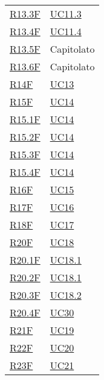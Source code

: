 \begin{center}
\begin{longtable}[!h]{p{50px} p{50px}}
        \hyperref[tab:RequisitiFunzionali]{R13.3F}   & \hyperref[sec:UC11.3]{UC11.3} \\
        \hyperref[tab:RequisitiFunzionali]{R13.4F}   & \hyperref[sec:UC11.4]{UC11.4} \\
        \hyperref[tab:RequisitiFunzionali]{R13.5F}   & Capitolato                    \\
        \hyperref[tab:RequisitiFunzionali]{R13.6F}   & Capitolato                    \\
        \hyperref[tab:RequisitiFunzionali]{R14F}     & \hyperref[sec:UC13]{UC13}     \\
        \hyperref[tab:RequisitiFunzionali]{R15F}     & \hyperref[sec:UC14]{UC14}     \\
        \hyperref[tab:RequisitiFunzionali]{R15.1F}   & \hyperref[sec:UC14]{UC14}     \\
        \hyperref[tab:RequisitiFunzionali]{R15.2F}   & \hyperref[sec:UC14]{UC14}     \\
        \hyperref[tab:RequisitiFunzionali]{R15.3F}   & \hyperref[sec:UC14]{UC14}     \\
        \hyperref[tab:RequisitiFunzionali]{R15.4F}   & \hyperref[sec:UC14]{UC14}     \\
        \hyperref[tab:RequisitiFunzionali]{R16F}     & \hyperref[sec:UC15]{UC15}     \\
        \hyperref[tab:RequisitiFunzionali]{R17F}     & \hyperref[sec:UC16]{UC16}     \\
        \hyperref[tab:RequisitiFunzionali]{R18F}     & \hyperref[sec:UC17]{UC17}     \\
        \hyperref[tab:RequisitiFunzionali]{R20F}     & \hyperref[sec:UC18]{UC18}     \\
        \hyperref[tab:RequisitiFunzionali]{R20.1F}   & \hyperref[sec:UC18.1]{UC18.1} \\
        \hyperref[tab:RequisitiFunzionali]{R20.2F}   & \hyperref[sec:UC18.1]{UC18.1} \\
        \hyperref[tab:RequisitiFunzionali]{R20.3F}   & \hyperref[sec:UC18.2]{UC18.2} \\
        \hyperref[tab:RequisitiFunzionali]{R20.4F}   & \hyperref[sec:UC30]{UC30}     \\
        \hyperref[tab:RequisitiFunzionali]{R21F}     & \hyperref[sec:UC19]{UC19}     \\
        \hyperref[tab:RequisitiFunzionali]{R22F}     & \hyperref[sec:UC20]{UC20}     \\
        \hyperref[tab:RequisitiFunzionali]{R23F}     & \hyperref[sec:UC21]{UC21}     \\

\end{longtable}
\end{center}
